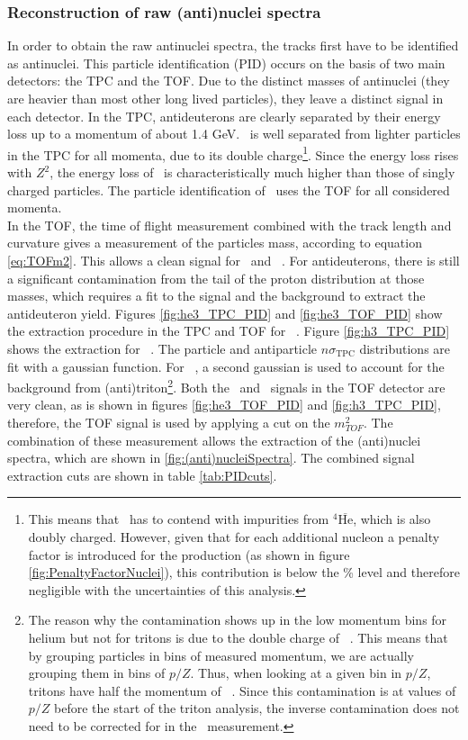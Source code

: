 \subsubsection{Reconstruction of raw (anti)nuclei spectra}\label{sec:Meth:PIDandSelections}
In order to obtain the raw antinuclei spectra, the tracks first have to be identified as antinuclei. This particle identification (PID) occurs on the basis of two main detectors: the TPC and the TOF. Due to the distinct masses of antinuclei (they are heavier than most other long lived particles), they leave a distinct signal in each detector. In the TPC, antideuterons are clearly separated by their energy loss up to a momentum of about 1.4 GeV. \ahe\ is well separated from lighter particles in the TPC for all momenta, due to its double charge\footnote{This means that \ahe\ has to contend with impurities from $^4\overline{\mathrm{He}}$, which is also doubly charged. However, given that for each additional nucleon a penalty factor is introduced for the production (as shown in figure \ref{fig:PenaltyFactorNuclei}), this contribution is below the \% level and therefore negligible with the uncertainties of this analysis.}. Since the energy loss rises with $Z^2$, the energy loss of \ahe\ is characteristically much higher than those of singly charged particles. The particle identification of \atrit\ uses the TOF for all considered momenta.\\
In the TOF, the time of flight measurement combined with the track length and curvature gives a measurement of the particles mass, according to equation \ref{eq:TOFm2}. This allows a clean signal for \atrit\ and \ahe\ . For antideuterons, there is still a significant contamination from the tail of the proton distribution at those masses, which requires a fit to the signal and the background to extract the antideuteron yield. Figures \ref{fig:he3_TPC_PID} and \ref{fig:he3_TOF_PID} show the extraction procedure in the TPC and TOF for \ahe\ . Figure \ref{fig:h3_TPC_PID} shows the extraction for \atrit\ . The particle and antiparticle $n\sigma_{\mathrm{TPC}}$ distributions are fit with a gaussian function. For \ahe\ , a second gaussian is used to account for the background from (anti)triton\footnote{The reason why the contamination shows up in the low momentum bins for helium but not for tritons is due to the double charge of \ahe\ . This means that by grouping particles in bins of measured momentum, we are actually grouping them in bins of $p/Z$. Thus, when looking at a given bin in $p/Z$, tritons have half the momentum of \ahe\ . Since this contamination is at values of $p/Z$ before the start of the triton analysis, the inverse contamination does not need to be corrected for in the \atrit\ measurement. }. Both the \ahe\ and \atrit\  signals in the TOF detector are very clean, as is shown in figures \ref{fig:he3_TOF_PID} and \ref{fig:h3_TPC_PID}, therefore, the TOF signal is used by applying a cut on the $m_{TOF}^2$.  The combination of these measurement allows the extraction of the (anti)nuclei spectra, which are shown in \ref{fig:(anti)nucleiSpectra}. The combined signal extraction cuts are shown in table \ref{tab:PIDcuts}.
